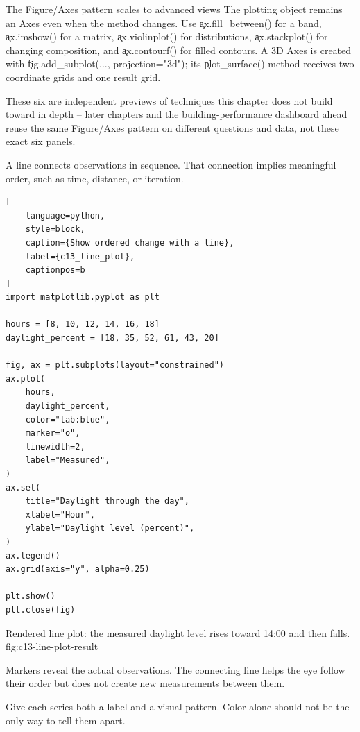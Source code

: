 \begin{SyntaxBox}{The Figure/Axes pattern scales to advanced views}
The plotting object remains an Axes even when the method changes. Use
\c{ax.fill_between()} for a band, \c{ax.imshow()} for a matrix,
\c{ax.violinplot()} for distributions, \c{ax.stackplot()} for changing
composition, and \c{ax.contourf()} for filled contours. A 3D Axes is created
with \c{fig.add_subplot(..., projection="3d")}; its
\c{plot_surface()} method receives two coordinate grids and one result grid.
\end{SyntaxBox}

These six are independent previews of techniques this chapter does not build
toward in depth -- later chapters and the building-performance dashboard
ahead reuse the same Figure/Axes pattern on different questions and data, not
these exact six panels.


A line connects observations in sequence. That connection implies meaningful
order, such as time, distance, or iteration.

\begin{lstlisting}[
    language=python,
    style=block,
    caption={Show ordered change with a line},
    label={c13_line_plot},
    captionpos=b
]
import matplotlib.pyplot as plt

hours = [8, 10, 12, 14, 16, 18]
daylight_percent = [18, 35, 52, 61, 43, 20]

fig, ax = plt.subplots(layout="constrained")
ax.plot(
    hours,
    daylight_percent,
    color="tab:blue",
    marker="o",
    linewidth=2,
    label="Measured",
)
ax.set(
    title="Daylight through the day",
    xlabel="Hour",
    ylabel="Daylight level (percent)",
)
ax.legend()
ax.grid(axis="y", alpha=0.25)

plt.show()
plt.close(fig)
\end{lstlisting}

{Rendered line plot: the measured daylight level rises toward 14:00 and then falls.}
{fig:c13-line-plot-result}

Markers reveal the actual observations. The connecting line helps the eye
follow their order but does not create new measurements between them.


Give each series both a label and a visual pattern. Color alone should not be
the only way to tell them apart.

